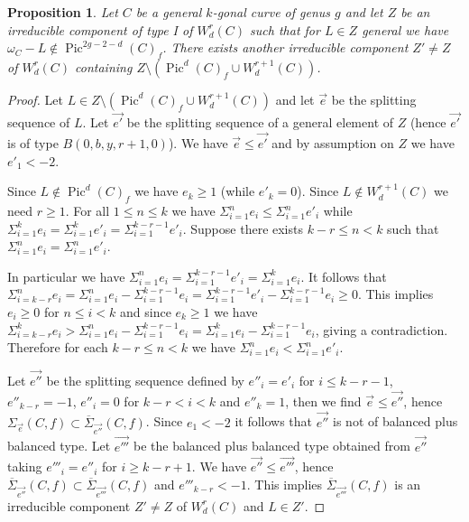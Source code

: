 \documentclass{article}
\DeclareMathOperator{\Pic}{Pic}
\newtheorem{proposition}{Proposition}
\theoremstyle{definition}
\theoremstyle{remark}
\begin{document}
\begin{proposition}\label{prop4}
Let $C$ be a general $k$-gonal curve of genus $g$ and let $Z$ be an irreducible component of type I of $W^r_d(C)$ such that for $L \in Z$ general we have $\omega _C -L \notin \Pic^{2g-2-d}(C)_f$.
There exists another irreducible component $Z' \neq Z$ of $W^r_d(C)$ containing $Z \setminus (\Pic^d(C)_f \cup W^{r+1}_d(C))$.
\end{proposition}
\begin{proof}
Let $L \in Z \setminus (\Pic^d(C)_f \cup W^{r+1}_d(C))$ and let $\overrightarrow {e}$ be the splitting sequence of $L$.
Let $\overrightarrow {e'}$ be the splitting sequence of a general element of $Z$ (hence $\overrightarrow {e'}$ is of type $B(0,b,y,r+1,0)$).
We have $\overrightarrow {e} \leq \overrightarrow {e'}$ and by assumption on $Z$ we have $e'_1<-2$.

Since $L \notin \Pic^d(C)_f$ we have $e_k \geq 1$ (while $e'_k=0$).
Since $L \notin W^{r+1}_d(C)$ we need $r\geq 1$.
For all $1 \leq n \leq k$ we have $\Sigma _{i=1}^n e_i \leq \Sigma _{i=1}^n e'_i$ while $\Sigma _{i=1}^k e_i=\Sigma _{i=1}^k e'_i=\Sigma _{i=1}^{k-r-1}e'_i$.
Suppose there exists $k-r \leq n <k$ such that $\Sigma _{i=1}^n e_i=\Sigma _{i=1}^n e'_i$.

In particular we have $\Sigma _{i=1}^n e_i=\Sigma _{i=1}^{k-r-1} e'_i=\Sigma _{i=1}^k e_i$.
It follows that $\Sigma _{i=k-r}^n e_i=\Sigma _{i=1}^ne_i -\Sigma _{i=1}^{k-r-1} e_i=\Sigma _{i=1}^{k-r-1} e'_i -\Sigma _{i=1}^{k-r-1}e_i \geq 0$.
This implies $e_i \geq 0$ for $n \leq i < k$ and since $e_k \geq 1$ we have $\Sigma _{i=k-r}^k e_i > \Sigma _{i=1}^n e_i -\Sigma _{i=1}^{k-r-1} e_i=\Sigma _{i=1}^k e_i -\Sigma _{i=1}^{k-r-1}e_i$, giving a contradiction.
Therefore for each $k-r \leq n <k$ we have $\Sigma _{i=1}^ne_i < \Sigma _{i=1}^n e'_i$.

Let $\overrightarrow {e''}$ be the splitting sequence defined by $e''_i=e'_i$ for $i \leq k-r-1$, $e''_{k-r}=-1$, $e''_i=0$ for $k-r<i<k$ and $e''_k=1$, then we find $\overrightarrow {e} \leq \overrightarrow {e''}$, hence $\Sigma_{\overrightarrow {e}}(C,f) \subset \overline {\Sigma}_{\overrightarrow {e''}}(C,f)$.
Since $e_1<-2$ it follows that $\overrightarrow {e''}$ is not of balanced plus balanced type.
Let $\overrightarrow {e'''}$ be the balanced plus balanced type obtained from $\overrightarrow {e''}$ taking $e'''_i=e''_i$ for $i \geq k-r+1$.
We have $\overrightarrow {e''} \leq \overrightarrow {e'''}$, hence $\overline {\Sigma} _{\overrightarrow{e''}}(C,f) \subset \overline {\Sigma}_{\overrightarrow {e'''}}(C,f)$ and $e'''_{k-r}<-1$.
This implies $\overline {\Sigma}_{\overrightarrow {e'''}}(C,f)$ is an irreducible component $Z' \neq Z$ of $W^r_d(C)$ and $L \in Z'$. 
\end{proof}
\end{document}
